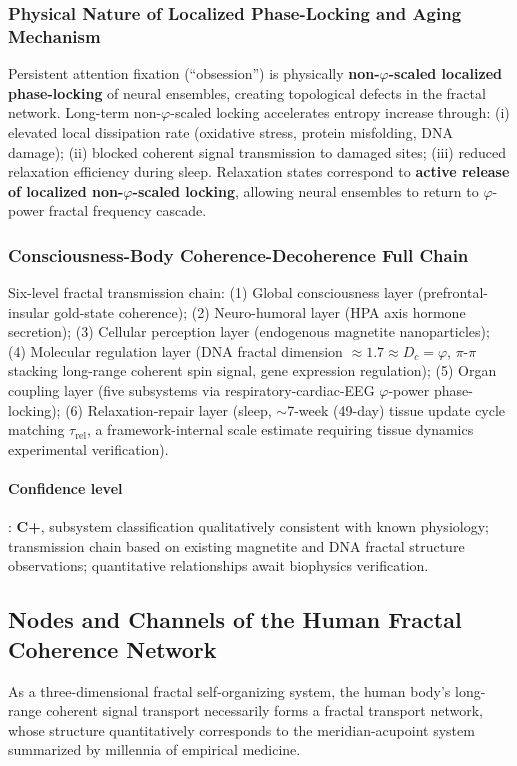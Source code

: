 \documentclass[12pt,a4paper,twocolumn]{article}
\renewcommand{\phi}{\varphi}
\begin{document}
\subsubsection{Physical Nature of Localized Phase-Locking and Aging Mechanism}
Persistent attention fixation (``obsession'') is physically \textbf{non-$\phi$-scaled localized phase-locking} of neural ensembles, creating topological defects in the fractal network. Long-term non-$\phi$-scaled locking accelerates entropy increase through: (i) elevated local dissipation rate (oxidative stress, protein misfolding, DNA damage); (ii) blocked coherent signal transmission to damaged sites; (iii) reduced relaxation efficiency during sleep. Relaxation states correspond to \textbf{active release of localized non-$\phi$-scaled locking}, allowing neural ensembles to return to $\phi$-power fractal frequency cascade.

\subsubsection{Consciousness-Body Coherence-Decoherence Full Chain}
Six-level fractal transmission chain: (1) Global consciousness layer (prefrontal-insular gold-state coherence); (2) Neuro-humoral layer (HPA axis hormone secretion); (3) Cellular perception layer (endogenous magnetite nanoparticles); (4) Molecular regulation layer (DNA fractal dimension $\approx1.7\approx D_c=\phi$, $\pi$-$\pi$ stacking long-range coherent spin signal, gene expression regulation); (5) Organ coupling layer (five subsystems via respiratory-cardiac-EEG $\phi$-power phase-locking); (6) Relaxation-repair layer (sleep, $\sim$7-week (49-day) tissue update cycle matching $\tau_{\text{rel}}$, a framework-internal scale estimate requiring tissue dynamics experimental verification).

\paragraph{Confidence level}: \textbf{C+}, subsystem classification qualitatively consistent with known physiology; transmission chain based on existing magnetite and DNA fractal structure observations; quantitative relationships await biophysics verification.


\subsection{Nodes and Channels of the Human Fractal Coherence Network}
\label{subsec:acupoint_meridian}
As a three-dimensional fractal self-organizing system, the human body's long-range coherent signal transport necessarily forms a fractal transport network, whose structure quantitatively corresponds to the meridian-acupoint system summarized by millennia of empirical medicine.
\end{document}
